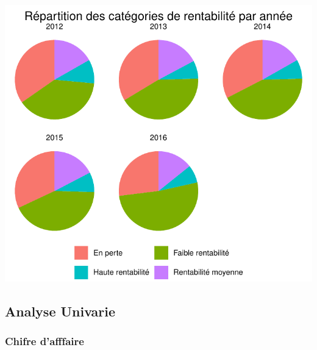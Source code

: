 \documentclass[mstat,12pt]{unswthesis}
\begin{document}
\medskip

\includegraphics{TDDT_projet_L_2_files/figure-latex/rentabilite-1.pdf}

\newpage

\subsection{Analyse Univarie}\label{analyse-univarie}

\medskip

\subsubsection{Chifre d'afffaire}\label{chifre-dafffaire}
\end{document}
